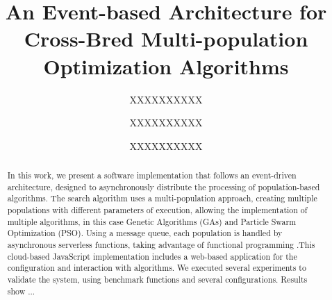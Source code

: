 \documentclass[runningheads]{llncs}
\begin{document}
%
\title{An Event-based Architecture for Cross-Bred Multi-population  Optimization Algorithms}
%
%
\author{XXXXXXXXXX \and
XXXXXXXXXX \and
XXXXXXXXXX}
%
%
%
\maketitle              %
%
\begin{abstract}
  In this work, we present a software implementation that follows an
  event-driven architecture, designed to asynchronously distribute the
  processing of population-based algorithms. The search algorithm uses a
  multi-population approach, creating multiple populations with different
  parameters of execution, allowing the implementation of multiple algorithms, in
  this case Genetic Algorithms (GAs) and Particle Swarm Optimization (PSO).
  Using a message queue, each population is handled by asynchronous
  serverless functions, taking advantage of functional programming
    .This cloud-based JavaScript implementation includes a web-based
    application for
    the configuration and interaction with algorithms. We executed
    several
    experiments to validate the system, using benchmark functions and
    several configurations. Results show ...




\end{abstract}
%
%
%
\end{document}
